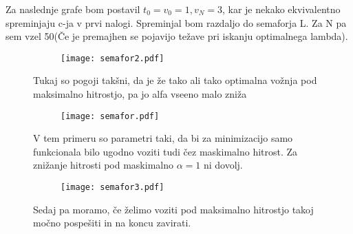 \documentclass{article}
\begin{document}
Za naslednje grafe bom postavil $t_0=v_0=1, v_N = 3$, kar je nekako ekvivalentno spreminjaju c-ja v prvi nalogi. Spreminjal bom razdaljo do semaforja L. Za N pa sem vzel 50(Če je premajhen se pojavijo težave pri iskanju optimalnega lambda).

\begin{figure}[H]
\centering
\begin{subfigure}{\textwidth}
\texttt{[image: semafor2.pdf]}
\end{subfigure}
\caption*{Tukaj so pogoji takšni, da je že tako ali tako optimalna vožnja pod maksimalno hitrostjo, pa jo alfa vseeno malo zniža}
\end{figure}



\begin{figure}[H]
\centering
\begin{subfigure}{\textwidth}
\texttt{[image: semafor.pdf]}
\end{subfigure}
\caption*{V tem primeru so parametri taki, da bi za minimizacijo samo funkcionala bilo ugodno voziti tudi čez maskimalno hitrost. Za znižanje hitrosti pod maskimalno $\alpha=1$ ni dovolj.}
\end{figure}

\begin{figure}[H]
\centering
\begin{subfigure}{\textwidth}
\texttt{[image: semafor3.pdf]}
\end{subfigure}
\caption*{Sedaj pa moramo, če želimo voziti pod maksimalno hitrostjo takoj močno pospešiti in na koncu zavirati.}
\end{figure}
\end{document}
